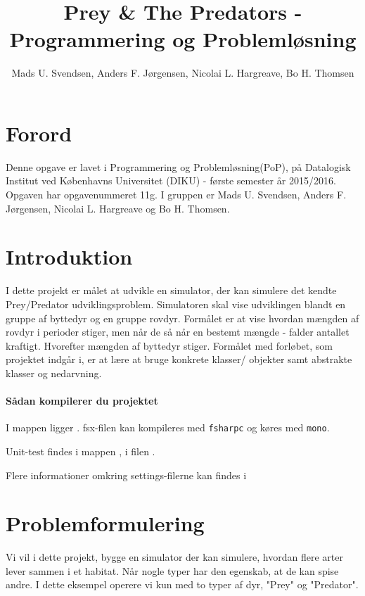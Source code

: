 \documentclass[a4paper]{article}
\title{Prey \& The Predators - Programmering og Problemløsning}
\author{Mads U. Svendsen, Anders F. Jørgensen, Nicolai L. Hargreave, Bo H. Thomsen}
\begin{document}
	\maketitle
  \tableofcontents
\section{Forord}
  Denne opgave er lavet i Programmering og Problemløsning(PoP),
    på Datalogisk Institut ved Københavns Universitet (DIKU) - første semester år 2015/2016.
    Opgaven har opgavenummeret 11g.
    I gruppen er Mads U. Svendsen, Anders F. Jørgensen, Nicolai L. Hargreave og Bo H. Thomsen.
\newpage
    
\section{Introduktion} \label{sec:introduction}
   I dette projekt er målet at udvikle en simulator,
   der kan simulere det kendte Prey/Predator udviklingsproblem.
   Simulatoren skal vise udviklingen blandt en gruppe af byttedyr 
   og en gruppe rovdyr. Formålet er at vise hvordan mængden af rovdyr i perioder stiger,
   men når de så når en bestemt mængde - falder antallet kraftigt. Hvorefter mængden af byttedyr stiger.
   Formålet med forløbet, som projektet indgår i, er at lære at bruge konkrete klasser/ objekter samt abstrakte klasser og nedarvning.

  \paragraph*{Sådan kompilerer du projektet\\}
    I  mappen ligger .
    fsx-filen kan kompileres med \texttt{fsharpc} og køres med \texttt{mono}.
    
    Unit-test findes i  mappen , i filen .

    Flere informationer omkring settings-filerne kan findes i 

\section{Problemformulering} \label{sec:problem}
  Vi vil i dette projekt, bygge en simulator der kan simulere,
  hvordan flere arter lever sammen i et habitat.
  Når nogle typer har den egenskab, at de kan spise andre.
  I dette eksempel operere vi kun med to typer af dyr, "Prey" og "Predator".
\end{document}
